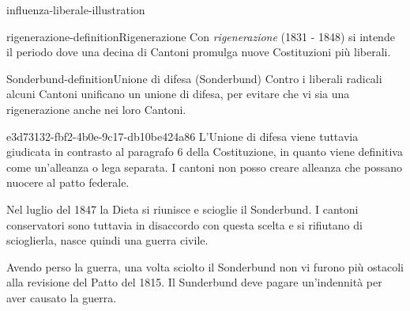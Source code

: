 \documentclass[preview]{standalone}
\begin{document}
\begin{snippet}{influenza-liberale-illustration}
    \begin{center}
    \end{center}
\end{snippet}

\begin{snippetdefinition}{rigenerazione-definition}{Rigenerazione}
    Con \textit{rigenerazione} (1831 - 1848) si intende il periodo dove una decina di Cantoni promulga nuove Costituzioni più liberali.
\end{snippetdefinition}

\begin{snippetdefinition}{Sonderbund-definition}{Unione di difesa (Sonderbund)}
    Contro i liberali radicali alcuni Cantoni unificano un unione di difesa,
    per evitare che vi sia una rigenerazione anche nei loro Cantoni.
\end{snippetdefinition}

\begin{snippet}{e3d73132-fbf2-4b0e-9c17-db10be424a86}
    L'Unione di difesa viene tuttavia giudicata in contrasto al paragrafo 6 della Costituzione, in quanto
    viene definitiva come un'alleanza o lega separata.
    I cantoni non posso creare alleanza che possano nuocere al patto federale.
    
    Nel luglio del 1847 la Dieta si riunisce e scioglie il Sonderbund.
    I cantoni conservatori sono tuttavia in disaccordo con questa scelta e si rifiutano di scioglierla,
    nasce quindi una guerra civile.
    
    Avendo perso la guerra, una volta sciolto il Sonderbund non vi furono più ostacoli alla revisione del Patto del 1815.
    Il Sunderbund deve pagare un'indennità per aver causato la guerra.
\end{snippet}
\end{document}
